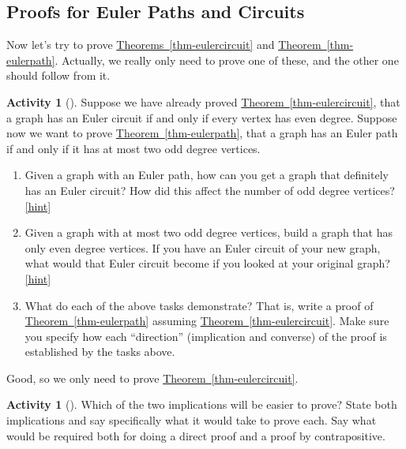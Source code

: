 \documentclass[10pt,]{book}
\theoremstyle{plain}
\theoremstyle{definition}
\theoremstyle{definition}
\theoremstyle{definition}
\newtheorem{activity}[project]{Activity}
\numberwithin{equation}{chapter}
\begin{document}
\subsection[{Proofs for Euler Paths and Circuits}]{Proofs for Euler Paths and Circuits}\label{subsection-3}
\hypertarget{p-178}{}%
Now let's try to prove \hyperref[thm-eulercircuit]{Theorems~\ref{thm-eulercircuit}} and \hyperref[thm-eulerpath]{Theorem~\ref{thm-eulerpath}}.  Actually, we really only need to prove one of these, and the other one should follow from it.%
\begin{activity}[]\label{activity-10}
\hypertarget{p-179}{}%
Suppose we have already proved \hyperref[thm-eulercircuit]{Theorem~\ref{thm-eulercircuit}}, that a graph has an Euler circuit if and only if every vertex has even degree.  Suppose now we want to prove \hyperref[thm-eulerpath]{Theorem~\ref{thm-eulerpath}}, that a graph has an Euler path if and only if it has at most two odd degree vertices.%
\begin{enumerate}[font=\bfseries,label=(\alph*),ref=\alph*]
\item\label{task-13} \hypertarget{p-180}{}%
Given a graph with an Euler path, how can you get a graph that definitely has an Euler circuit?  How did this affect the number of odd degree vertices?%
\hfill{\tiny\hyperlink{a-15.a}{[hint]}\hypertarget{q-15.a}{}}\item\label{task-14} \hypertarget{p-182}{}%
Given a graph with at most two odd degree vertices, build a graph that has only even degree vertices.  If you have an Euler circuit of your new graph, what would that Euler circuit become if you looked at your original graph?%
\hfill{\tiny\hyperlink{a-15.b}{[hint]}\hypertarget{q-15.b}{}}\item\label{task-15} \hypertarget{p-184}{}%
What do each of the above tasks demonstrate?  That is, write a proof of \hyperref[thm-eulerpath]{Theorem~\ref{thm-eulerpath}} assuming \hyperref[thm-eulercircuit]{Theorem~\ref{thm-eulercircuit}}.  Make sure you specify how each ``direction'' (implication and converse) of the proof is established by the tasks above.%
\end{enumerate}
\end{activity}
\hypertarget{p-185}{}%
Good, so we only need to prove \hyperref[thm-eulercircuit]{Theorem~\ref{thm-eulercircuit}}.%
\begin{activity}[]\label{activity-11}
\hypertarget{p-186}{}%
Which of the two implications will be easier to prove?  State both implications and say specifically what it would take to prove each.  Say what would be required both for doing a direct proof and a proof by contrapositive.%
\end{activity}
\end{document}
